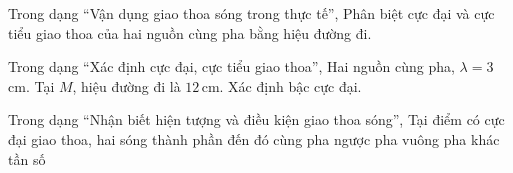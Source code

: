 \begin{ex}
Trong dạng “Vận dụng giao thoa sóng trong thực tế”, Phân biệt cực đại và cực tiểu giao thoa của hai nguồn cùng pha bằng hiệu đường đi.
\choiceTF

\end{ex}

\begin{ex}
Trong dạng “Xác định cực đại, cực tiểu giao thoa”, Hai nguồn cùng pha, $\lambda=3$ cm. Tại $M$, hiệu đường đi là $12\,\text{cm}$. Xác định bậc cực đại.
\end{ex}

\begin{ex}
Trong dạng “Nhận biết hiện tượng và điều kiện giao thoa sóng”, Tại điểm có cực đại giao thoa, hai sóng thành phần đến đó
\choice
{\True cùng pha}
{ngược pha}
{vuông pha}
{khác tần số}
\end{ex}


